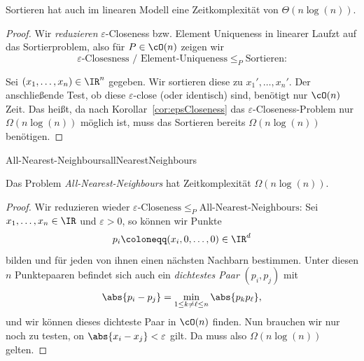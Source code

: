 \documentclass[language=ngerman,algolist,acrolist]{TemplateLecture}
\begin{document}
\begin{cor}
    Sortieren hat auch im linearen Modell eine Zeitkomplexität von $\Theta(n \log(n))$.
\end{cor}
\begin{proof}
    Wir \emph{reduzieren} $\varepsilon$-Closeness bzw. Element Uniqueness in linearer Laufzt auf das Sortierproblem, also für $P \in \cO(n)$ zeigen wir 
    \begin{equation*}
        \text{$\varepsilon$-Closesness / Element-Uniqueness} \leq_P \text{Sortieren:}
    \end{equation*}

    Sei $(x_1, \ldots, x_n) \in \IR^n$ gegeben. Wir sortieren diese zu $x_1', \ldots, x_n'$. Der anschließende Test, ob diese $\varepsilon$-close (oder identisch) sind, benötigt nur $\cO(n)$ Zeit. Das heißt, da nach Korollar~\ref{cor:epsCloseness} das $\varepsilon$-Closeness-Problem nur $\Omega(n \log(n))$ möglich ist, muss das Sortieren bereits $\Omega(n \log(n))$ benötigen.
\end{proof}

\begin{prob}{All-Nearest-Neighbours}{allNearestNeighbours}
\end{prob}

\begin{cor}
    Das Problem \emph{All-Nearest-Neighbours} hat Zeitkomplexität $\Omega(n \log(n))$.
\end{cor}

\begin{proof}
    Wir reduzieren wieder $\varepsilon\text{-Closeness} \leq_P \text{All-Nearest-Neighbours}$: Sei $x_1, \ldots, x_n \in \IR$ und $\varepsilon > 0$, so können wir Punkte 
    \begin{equation*}
        p_i \coloneqq (x_i, 0, \ldots, 0) \in \IR^d
    \end{equation*}
    bilden und für jeden von ihnen einen nächsten Nachbarn bestimmen. Unter diesen $n$ Punktepaaren befindet sich auch ein \emph{dichtestes Paar} $(p_i, p_j)$ mit
    \begin{equation*}
        \abs{p_i - p_j} = \min_{1 \leq k \neq \ell \leq n} \abs{p_k p_\ell},
    \end{equation*} 
    und wir können dieses dichteste Paar in $\cO(n)$ finden. Nun brauchen wir nur noch zu testen, on $\abs{x_i - x_j} < \varepsilon$ gilt. Da muss also $\Omega(n \log(n))$ gelten.
\end{proof}
\end{document}
